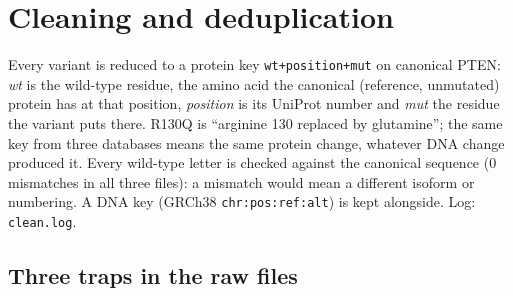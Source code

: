 \documentclass[11pt,a4paper]{article}
\newcommand{\file}[1]{\texttt{#1}}
\begin{document}
\section{Cleaning and deduplication}

Every variant is reduced to a protein key \texttt{wt+position+mut} on
canonical PTEN: \emph{wt} is the wild-type residue, the amino acid the
canonical (reference, unmutated) protein has at that position, \emph{position}
is its UniProt number and \emph{mut} the residue the variant puts there. R130Q
is ``arginine 130 replaced by glutamine''; the same key from three databases
means the same protein change, whatever DNA change produced it. Every
wild-type letter is checked against the canonical sequence (0 mismatches in
all three files): a mismatch would mean a different isoform or numbering. A DNA key (GRCh38
\texttt{chr:pos:ref:alt}) is kept alongside. Log: \file{clean.log}.

\subsection{Three traps in the raw files}
\end{document}
